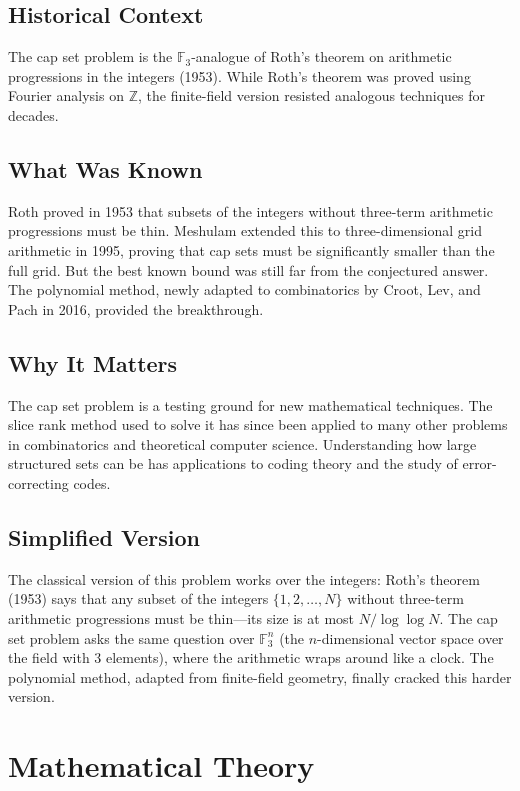 \subsection{Historical Context}
The cap set problem is the $\mathbb{F}_3$-analogue of Roth's theorem on arithmetic progressions in the integers (1953). While Roth's theorem was proved using Fourier analysis on $\mathbb{Z}$, the finite-field version resisted analogous techniques for decades.

\subsection{What Was Known}
Roth proved in 1953 that subsets of the integers without three-term arithmetic progressions must be thin. Meshulam extended this to three-dimensional grid arithmetic in 1995, proving that cap sets must be significantly smaller than the full grid. But the best known bound was still far from the conjectured answer. The polynomial method, newly adapted to combinatorics by Croot, Lev, and Pach in 2016, provided the breakthrough.

\subsection{Why It Matters}
The cap set problem is a testing ground for new mathematical techniques. The slice rank method used to solve it has since been applied to many other problems in combinatorics and theoretical computer science. Understanding how large structured sets can be has applications to coding theory and the study of error-correcting codes.

\subsection{Simplified Version}
The classical version of this problem works over the integers: Roth's theorem (1953) says that any subset of the integers $\{1, 2, \ldots, N\}$ without three-term arithmetic progressions must be thin---its size is at most $N / \log \log N$. The cap set problem asks the same question over $\mathbb{F}_3^n$ (the $n$-dimensional vector space over the field with 3 elements), where the arithmetic wraps around like a clock. The polynomial method, adapted from finite-field geometry, finally cracked this harder version.

\section{Mathematical Theory}

